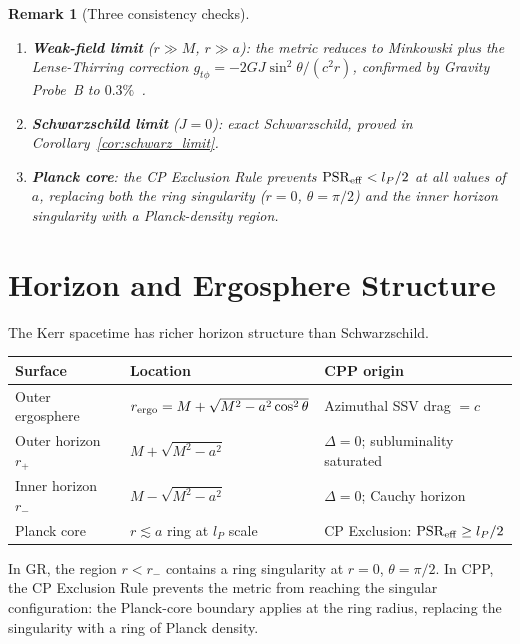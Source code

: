 \documentclass[12pt]{article}
\newtheorem{remark}[theorem]{Remark}
\newcommand{\lP}{l_P}
\newcommand{\rplus}{r_+}
\newcommand{\rminus}{r_-}
\newcommand{\PSR}{\mathrm{PSR}}
\newcommand{\Dlt}{\Delta}
\begin{document}
\begin{remark}[Three consistency checks]
\quad
\begin{enumerate}[noitemsep]
  \item \textbf{Weak-field limit} ($r \gg M$, $r \gg a$): the metric
    reduces to Minkowski plus the Lense-Thirring correction
    $g_{t\phi} = -2GJ\sin^2\theta/(c^2 r)$, confirmed by Gravity
    Probe~B to $0.3\%$~\cite{everitt2011}.
  \item \textbf{Schwarzschild limit} ($J = 0$): exact Schwarzschild,
    proved in Corollary~\ref{cor:schwarz_limit}.
  \item \textbf{Planck core}: the CP Exclusion Rule prevents
    $\PSR_{\rm eff} < \lP/2$ at all values of $a$, replacing both the
    ring singularity ($r=0$, $\theta=\pi/2$) and the inner horizon
    singularity with a Planck-density region.
\end{enumerate}
\end{remark}

\section{Horizon and Ergosphere Structure}
\label{sec:horizons}

The Kerr spacetime has richer horizon structure than Schwarzschild.

\begin{center}
\renewcommand{\arraystretch}{1.35}
\begin{tabular}{@{}lll@{}}
\toprule
Surface & Location & CPP origin \\
\midrule
Outer ergosphere & $r_{\rm ergo} = M + \sqrt{M^2-a^2\cos^2\theta}$
  & Azimuthal SSV drag $= c$ \\
Outer horizon $\rplus$ & $M + \sqrt{M^2-a^2}$
  & $\Dlt = 0$; subluminality saturated \\
Inner horizon $\rminus$ & $M - \sqrt{M^2-a^2}$
  & $\Dlt = 0$; Cauchy horizon \\
Planck core & $r \lesssim a$ ring at $\lP$ scale
  & CP Exclusion: $\PSR_{\rm eff} \geq \lP/2$ \\
\bottomrule
\end{tabular}
\end{center}

In GR, the region $r < \rminus$ contains a ring singularity at
$r=0$, $\theta = \pi/2$.  In CPP, the CP Exclusion Rule prevents the
metric from reaching the singular configuration: the Planck-core
boundary applies at the ring radius, replacing the singularity with a
ring of Planck density.
\end{document}
